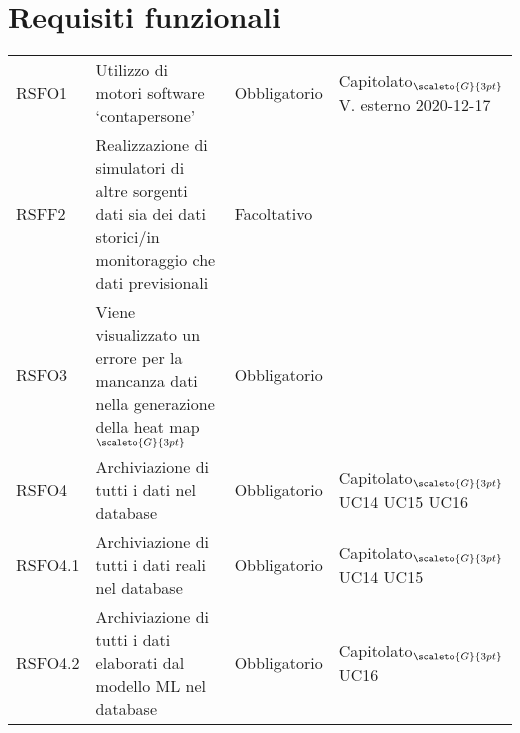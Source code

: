 \clearpage
\section{Requisiti funzionali}\label{RequisitiFunzionali}

\def\tabularxcolumn#1{m{#1}}
{

	\begin{center}
		\renewcommand{\arraystretch}{1.4}
		\begin{longtable}{|p{2.5cm}|p{4.5cm}|p{3.5cm}|p{4cm}|}
			\hline
			\rowcolor{airforceblue}
			\makecell[c]{\textbf{Codice RS}} & \makecell[c]{\textbf{Descrizione}} & \makecell[c]{\textbf{Tipo di requisito}} & \makecell[c]{\textbf{Fonte}} \\
			\hline
			\centering RSFO1 & Utilizzo di motori software ‘contapersone’  &\centering  Obbligatorio & \makecell[tc]{Capitolato$_{\scaleto{G}{3pt}}$ \\ V. esterno 2020-12-17 } \\
			\hline
			\centering RSFF2 & Realizzazione di simulatori di altre sorgenti dati sia dei dati storici/in monitoraggio che dati previsionali & \centering Facoltativo & \makecell[tc]{Capitolato$_{\scaleto{G}{3pt}}$ } \\
			\hline
			\centering RSFO3  & Viene visualizzato un  errore per la mancanza dati nella generazione della heat map$_{\scaleto{G}{3pt}}$  &\centering  Obbligatorio & \makecell[tc]{UC2}  \\
			\hline
			\centering RSFO4 & Archiviazione di tutti i dati nel database & \centering Obbligatorio & \makecell[tc]{Capitolato$_{\scaleto{G}{3pt}}$ \\ UC14  \\ UC15 \\ UC16} \\
			\hline
			\centering RSFO4.1 & Archiviazione di tutti i dati reali nel database & \centering Obbligatorio & \makecell[tc]{Capitolato$_{\scaleto{G}{3pt}}$ \\ UC14 \\ UC15}  \\
			\hline
			\centering RSFO4.2 & Archiviazione di tutti i dati elaborati dal modello ML nel database & \centering Obbligatorio & \makecell[tc]{Capitolato$_{\scaleto{G}{3pt}}$ \\ UC16}  \\

\end{longtable}
\end{center}}
